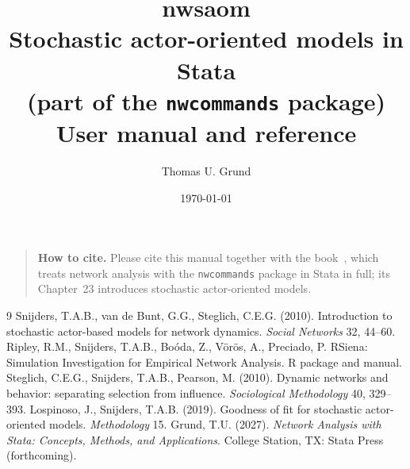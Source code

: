 \documentclass[11pt,a4paper]{report}
\title{\textbf{nwsaom}\\[4pt]\large Stochastic actor-oriented models in Stata\\ (part of the \texttt{nwcommands} package)\\[6pt]\normalsize User manual and reference}
\author{Thomas U. Grund}
\date{\today}
\begin{document}
\maketitle
\begin{quote}\noindent\textbf{How to cite.} Please cite this manual together with the book~\cite{grundbook}, which treats network analysis with the \texttt{nwcommands} package in Stata in full; its Chapter~23 introduces stochastic actor-oriented models. %
\end{quote}
\tableofcontents














\appendix




\begin{thebibliography}{9}
 Snijders, T.A.B., van de Bunt, G.G., Steglich, C.E.G. (2010). Introduction to stochastic actor-based models for network dynamics. \emph{Social Networks} 32, 44--60.
 Ripley, R.M., Snijders, T.A.B., Bo\'{o}da, Z., V\"{o}r\"{o}s, A., Preciado, P. RSiena: Simulation Investigation for Empirical Network Analysis. R package and manual.
 Steglich, C.E.G., Snijders, T.A.B., Pearson, M. (2010). Dynamic networks and behavior: separating selection from influence. \emph{Sociological Methodology} 40, 329--393.
 Lospinoso, J., Snijders, T.A.B. (2019). Goodness of fit for stochastic actor-oriented models. \emph{Methodology} 15.
 Grund, T.U. (2027). \emph{Network Analysis with Stata: Concepts, Methods, and Applications}. College Station, TX: Stata Press (forthcoming).
\end{thebibliography}
\end{document}
